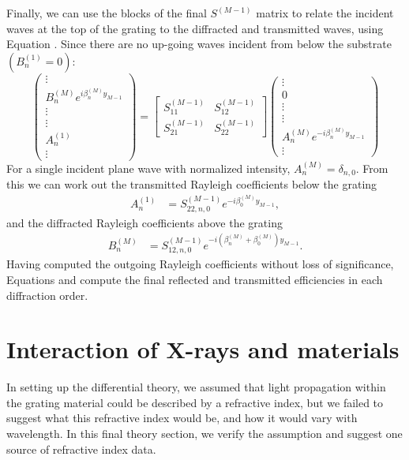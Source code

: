 Finally, we can use the blocks of the final $S^{(M-1)}$ matrix to relate the incident waves at the top of the grating to the diffracted and transmitted waves, using Equation . Since there are no up-going waves incident from below the substrate $(B_n^{(1)} = 0)$:
\begin{equation}
 \left(\begin{array}{c}\vdots \\ B^{(M)}_n  e^{i \beta^{(M)}_n y_{M-1}} \\ \vdots \\\hline \vdots \\ A^{(1)}_n \\ \vdots\end{array}\right) =            \left[\begin{array}{c|c}S^{(M-1)}_{11} & S^{(M-1)}_{12} \\\hline S^{(M-1)}_{21} & S^{(M-1)}_{22}\end{array}\right]       \left(\begin{array}{c}\vdots \\ 0  \\ \vdots \\\hline \vdots \\ A^{(M)}_n e^{-i \beta^{(M)}_n y_{M-1}} \\ \vdots\end{array}\right) 
 \label{sMatrixDef}
\end{equation}
For a single incident plane wave with normalized intensity, $A_n^{(M)} = \delta_{n,0}$.  From this we can work out the transmitted Rayleigh coefficients below the grating
\begin{align}
A_n^{(1)} &= S_{22,n,0}^{(M-1)} e^{-i \beta_0^{(M)}y_{M-1}},
\end{align}
and the diffracted Rayleigh coefficients above the grating
\begin{align}
B_n^{(M)} &= S_{12,n,0}^{(M-1)} e^{-i (\beta_n^{(M)} + \beta_0^{(M)}) y_{M-1}}.
\end{align}
Having computed the outgoing Rayleigh coefficients without loss of significance, Equations  and  compute the final reflected and transmitted efficiencies in each diffraction order.

\section{Interaction of X-rays and materials}
In setting up the differential theory, we assumed that light propagation within the grating material could be described by a refractive index, but we failed to suggest what this refractive index would be, and how it would vary with wavelength.  In this final theory section, we verify the assumption and suggest one source of refractive index data.


